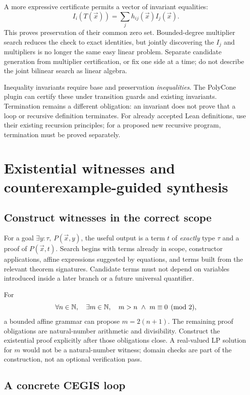 A more expressive certificate permits a vector of invariant equalities:
\[
 I_i(T(\vec x))=\sum_j h_{ij}(\vec x)I_j(\vec x).
\]
This proves preservation of their common zero set. Bounded-degree multiplier
search reduces the check to exact identities, but jointly discovering the
$I_j$ and multipliers is no longer the same easy linear problem. Separate
candidate generation from multiplier certification, or fix one side at a time;
do not describe the joint bilinear search as linear algebra.

Inequality invariants require base and preservation \emph{inequalities}. The
PolyCone plugin can certify these under transition guards and existing
invariants. Termination remains a different obligation: an invariant does not
prove that a loop or recursive definition terminates. For already accepted
Lean definitions, use their existing recursion principles; for a proposed new
recursive program, termination must be proved separately.

\section{Existential witnesses and counterexample-guided synthesis}

\subsection{Construct witnesses in the correct scope}

For a goal $\exists y:\tau,\ P(\vec x,y)$, the useful output is a term $t$ of
\emph{exactly} type $\tau$ and a proof of $P(\vec x,t)$. Search begins with
terms already in scope, constructor applications, affine expressions suggested
by equations, and terms built from the relevant theorem signatures. Candidate
terms must not depend on variables introduced inside a later branch or a
future universal quantifier.

For
\[
 \forall n\in\mathbb{N},\quad\exists m\in\mathbb{N},\quad m>n\ \wedge\ m\equiv0\pmod2,
\]
a bounded affine grammar can propose $m=2(n+1)$. The remaining proof obligations
are natural-number arithmetic and divisibility. Construct the existential
proof explicitly after those obligations close. A real-valued LP solution for
$m$ would not be a natural-number witness; domain checks are part of the
construction, not an optional verification pass.

\subsection{A concrete CEGIS loop}


